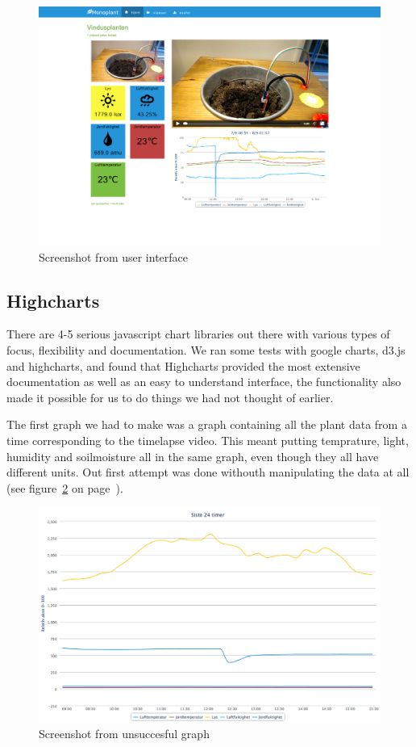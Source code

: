 \begin{figure}
\centering
\includegraphics[width=1\textwidth]{img/interface/mainpage.png}
\caption{Screenshot from user interface}
\label{fig:mainpage}
\end{figure}

\subsection{Highcharts}
There are 4-5 serious javascript chart libraries out there with various types of focus, flexibility and documentation. We ran some tests with google charts, d3.js and highcharts, and found that Highcharts provided the most extensive documentation as well as an easy to understand interface, the functionality also made it possible for us to do things we had not thought of earlier.

The first graph we had to make was a graph containing all the plant data from a time corresponding to the timelapse video. This meant putting temprature, light, humidity and soilmoisture all in the same graph, even though they all have different units. Out first attempt was done withouth manipulating the data at all (see figure~\ref{fig:badgraph} on page~\pageref{fig:badgraph}). 

\begin{figure}
\centering
\includegraphics[width=1\textwidth]{img/interface/badgraph.png}
\caption{Screenshot from unsuccesful graph}
\label{fig:badgraph}
\end{figure}

